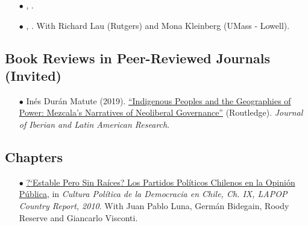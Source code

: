 \begin{itemize}
  	\item[$\bullet$] \href{https://raw.githubusercontent.com/hbahamonde/Negative_Link_Paper/master/abstract.txt}{\unskip}, {\bf \emph{\unskip}}. 

  	\item[$\bullet$] \href{https://raw.githubusercontent.com/hbahamonde/Running_Tally/master/abstract.txt}{\unskip}, {\bf \emph{\unskip}}. With Richard Lau (Rutgers) and Mona Kleinberg (UMass - Lowell). 






\end{itemize}




\subsection*{Book Reviews in Peer-Reviewed Journals (Invited)}

\begin{itemize}
	\item[$\bullet$] In\'es Dur\'an Matute (2019). \href{https://doi.org/10.1080/13260219.2019.1671679}{``Indigenous Peoples and the Geographies of Power: Mezcala's Narratives of Neoliberal Governance''} (Routledge). \emph{Journal of Iberian and Latin American Research}. %
\end{itemize}

\subsection*{Chapters}

\begin{itemize}
\item[$\bullet$] \href{http://www.vanderbilt.edu/lapop/chile/Chile-2010-cultura-politica.pdf}{?`Estable Pero Sin Ra\'ices? Los Partidos Pol\'iticos Chilenos en la Opini\'on P\'ublica}, in \emph{Cultura Pol\'itica de la Democracia en Chile, Ch. IX, LAPOP Country Report, 2010}. With Juan Pablo Luna, Germ\'an Bidegain, Roody Reserve and Giancarlo Visconti.
\end{itemize}



